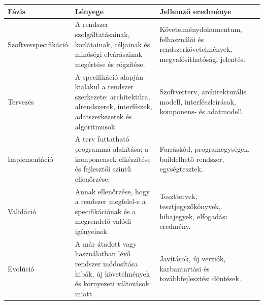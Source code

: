 \begin{tabularx}{\textwidth}{L{31mm}X X}
\toprule
\textbf{Fázis} & \textbf{Lényege} & \textbf{Jellemző eredménye} \\
\midrule
Szoftverspecifikáció & A rendszer szolgáltatásainak, korlátainak, céljainak és minőségi elvárásainak megértése és rögzítése. & Követelménydokumentum, felhasználói és rendszerkövetelmények, megvalósíthatósági jelentés. \\
Tervezés & A specifikáció alapján kialakul a rendszer szerkezete: architektúra, alrendszerek, interfészek, adatszerkezetek és algoritmusok. & Szoftverterv, architekturális modell, interfészleírások, komponens- és adatmodell. \\
Implementáció & A terv futtatható programmá alakítása; a komponensek elkészítése és fejlesztői szintű ellenőrzése. & Forráskód, programegységek, buildelhető rendszer, egységtesztek. \\
Validáció & Annak ellenőrzése, hogy a rendszer megfelel-e a specifikációnak és a megrendelő valódi igényeinek. & Teszttervek, tesztjegyzőkönyvek, hibajegyek, elfogadási eredmény. \\
Evolúció & A már átadott vagy használatban lévő rendszer módosítása hibák, új követelmények és környezeti változások miatt. & Javítások, új verziók, karbantartási és továbbfejlesztési döntések. \\
\bottomrule
\end{tabularx}
